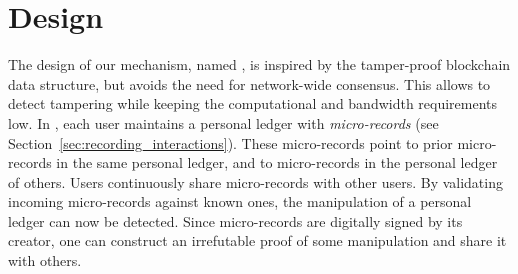 



\section{\ModelName{} Design}
\label{sec:micro_accounting}
The design of our mechanism, named \ModelName{}, is inspired by the tamper-proof blockchain data structure, but avoids the need for network-wide consensus.
This allows to detect tampering while keeping the computational and bandwidth requirements low.
In \ModelName{}, each user maintains a personal ledger with \emph{micro-records} (see Section~\ref{sec:recording_interactions}).
These micro-records point to prior micro-records in the same personal ledger, and to micro-records in the personal ledger of others.
Users continuously share micro-records with other users.
By validating incoming micro-records against known ones, the manipulation of a personal ledger can now be detected.
Since micro-records are digitally signed by its creator, one can construct an irrefutable proof of some manipulation and share it with others.

